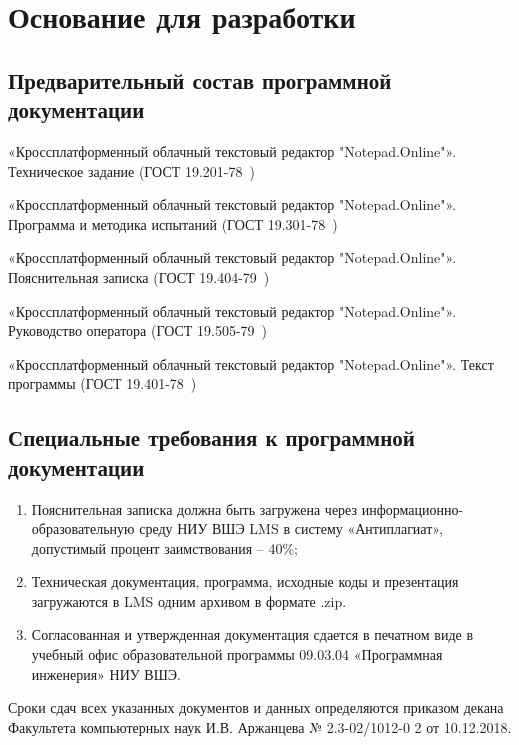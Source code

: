 \section{Основание для разработки}

%
%

\subsection{Предварительный состав программной документации}\label{subsection:documentation}
«Кроссплатформенный облачный текстовый редактор "Notepad.Online"». Техническое задание (ГОСТ 19.201-78~\cite{espd201})

«Кроссплатформенный облачный текстовый редактор "Notepad.Online"». Программа и методика испытаний (ГОСТ 19.301-78~\cite{espd301})

«Кроссплатформенный облачный текстовый редактор "Notepad.Online"». Пояснительная записка (ГОСТ 19.404-79~\cite{espd404})

«Кроссплатформенный облачный текстовый редактор "Notepad.Online"». Руководство оператора (ГОСТ 19.505-79~\cite{espd505})

«Кроссплатформенный облачный текстовый редактор "Notepad.Online"». Текст программы (ГОСТ 19.401-78~\cite{espd401})

\subsection{Специальные требования к программной документации}
\begin{enumerate}
	\item Пояснительная записка должна быть загружена через информационно-образовательную среду НИУ ВШЭ LMS в систему «Антиплагиат», допустимый процент заимствования – 40\%;
	\item Техническая документация, программа, исходные коды и презентация загружаются в LMS одним архивом в формате .zip.
	\item Согласованная и утвержденная документация сдается в печатном виде в учебный офис образовательной программы 09.03.04 «Программная инженерия» НИУ ВШЭ.
\end{enumerate}

Сроки сдач всех указанных документов и данных определяются приказом декана Факультета компьютерных наук И.В. Аржанцева № 2.3-02/1012-0 2 от 10.12.2018. 
